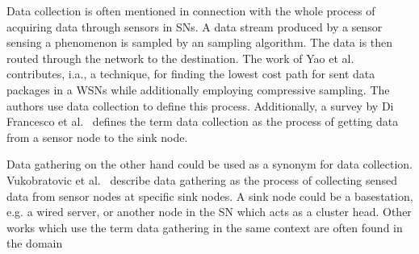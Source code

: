 \par
Data collection is often mentioned in connection with the whole process of
acquiring data through sensors in \acp{SN}.
A data stream produced by a sensor sensing a phenomenon is sampled by an
sampling algorithm. The data is then routed through the network to the
destination. The work of Yao et al.~\cite{yao2015edal} contributes, i.a., a
technique, for finding the lowest cost path for sent data packages in a
\acp{WSN} while additionally employing compressive sampling. The authors use
data collection to define this process. Additionally, a survey by Di Francesco
et al.~\cite{di2011data} defines the term data collection as the process of
getting data from a sensor node to the sink node.
\par
Data gathering on the other hand could be used as a synonym for data
collection. Vukobratovic et al.~\cite{vukobratovic2010rateless} describe data
gathering as the process of collecting sensed data from sensor nodes at
specific sink nodes. A sink node could be a basestation, e.g. a wired server,
or another node in the \ac{SN} which acts as a cluster head. Other works which
use the term data gathering in the same context are often found in the domain
